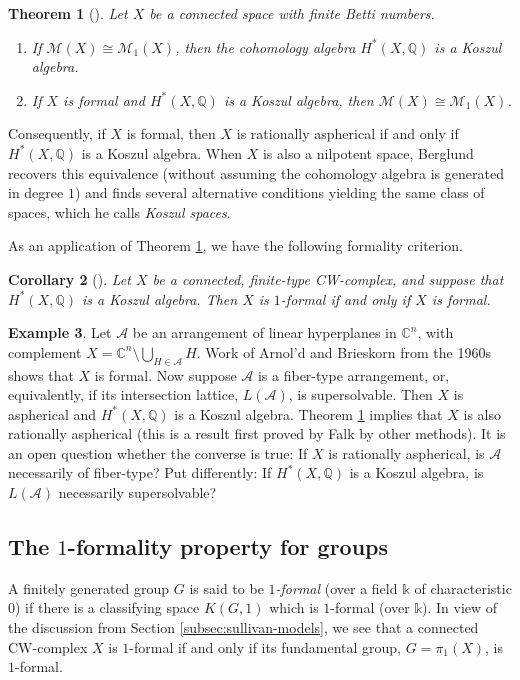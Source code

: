 \documentclass{article}
\numberwithin{equation}{section}
\newtheorem{theorem}{Theorem}[section]
\newtheorem{corollary}[theorem]{Corollary}
\theoremstyle{definition}
\newtheorem{example}[theorem]{Example}
\newcommand{\Q}{\mathbb{Q}}
\renewcommand{\C}{\mathbb{C}}
\renewcommand{\k}{\mathbb{k}}
\newcommand{\A}{{\mathcal{A}}}
\newcommand{\M}{\mathcal{M}}
\begin{document}
\begin{theorem}[\cite{PY99}]
\label{thm:py}
Let $X$ be a connected space with finite Betti numbers.  
\begin{enumerate}
\item \label{py1}
If $\M(X)\cong \M_1(X)$, then the cohomology algebra 
$H^{*}(X,\Q)$ is a Koszul algebra.
\item  \label{py2}
If $X$ is formal and $H^{*}(X,\Q)$ is a Koszul algebra, then 
$\M(X)\cong \M_1(X)$.
\end{enumerate}
\end{theorem}

Consequently, if $X$ is formal, then $X$ is rationally aspherical 
if and only if $H^{*}(X,\Q)$ is a Koszul algebra. When $X$ is also 
a nilpotent space, Berglund \cite{Berglund} recovers this equivalence 
(without assuming the cohomology algebra is generated in degree $1$) 
and finds several alternative conditions yielding the same 
class of spaces, which he calls {\em Koszul spaces}. 

As an application of Theorem \ref{thm:py}, we have the 
following formality criterion.

\begin{corollary}[\cite{PS-mathann}]
\label{cor:ps-koszul}
Let $X$ be a connected, finite-type CW-complex, 
and suppose that $H^*(X,\Q)$ is a Koszul algebra.  
Then $X$ is $1$-formal if and only if $X$ is formal. 
\end{corollary}

\begin{example}
\label{ex:fiber-type}
Let $\A$ be an arrangement of linear hyperplanes in $\C^{n}$, 
with complement $X=\C^{n} \setminus \bigcup_{H\in \A} H$. 
Work of Arnol'd and Brieskorn from the 1960s shows that 
$X$ is formal. Now suppose $\A$ is a fiber-type arrangement, 
or, equivalently, if its intersection lattice, $L(\A)$, is supersolvable. 
Then $X$ is aspherical and $H^{*}(X,\Q)$ is a Koszul algebra. 
Theorem \ref{thm:py} implies that $X$ is also rationally aspherical 
(this is a result first proved by Falk \cite{Falk} by other methods). 
It is an open question whether the converse is true: If $X$ is rationally 
aspherical, is $\A$ necessarily of fiber-type? Put differently:  If $H^{*}(X,\Q)$ is 
a Koszul algebra, is $L(\A)$ necessarily supersolvable?
\end{example}

\subsection{The $1$-formality property for groups}
\label{subsec:1-formal}
A finitely generated group $G$ is said to be {\em $1$-formal}\/ 
(over a field $\k$ of characteristic $0$) 
if there is a classifying space $K(G,1)$ which is $1$-formal (over $\k$). 
In view of the discussion from Section \ref{subsec:sullivan-models}, 
we see that a connected CW-complex $X$ is $1$-formal if and 
only if its fundamental group, $G=\pi_1(X)$, is $1$-formal. 
\end{document}
